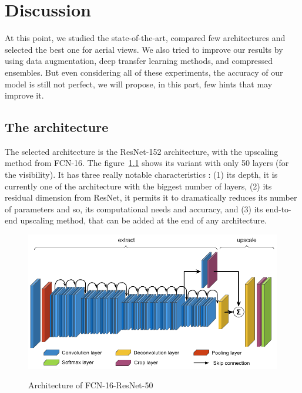 \chapter{Discussion}


At this point, we studied the state-of-the-art, compared few architectures and selected the best one for aerial views. We also tried to improve our results by using data augmentation, deep transfer learning methods, and compressed ensembles. But even considering all of these experiments, the accuracy of our model is still not perfect, we will propose, in this part, few hints that may improve it.


\section{The architecture}
The selected architecture is the ResNet-152 architecture, with the upscaling method from FCN-16. The figure~\ref{fig:part5:fcn16_resnet_architecture} shows its variant with only 50 layers (for the visibility). It has three really notable characteristics : (1) its depth, it is currently one of the architecture with the biggest number of layers, (2) its residual dimension from ResNet, it permits it to dramatically reduces its number of parameters and so, its computational needs and accuracy, and (3) its end-to-end upscaling method, that can be added at the end of any architecture.

\begin{figure}[ht!]
  \includegraphics[width=\linewidth,center]{images/part5/fcn16_resnet_architecture.png}
  \caption{Architecture of FCN-16-ResNet-50}\textbf{
  \label{fig:part5:fcn16_resnet_architecture}}
\end{figure}

